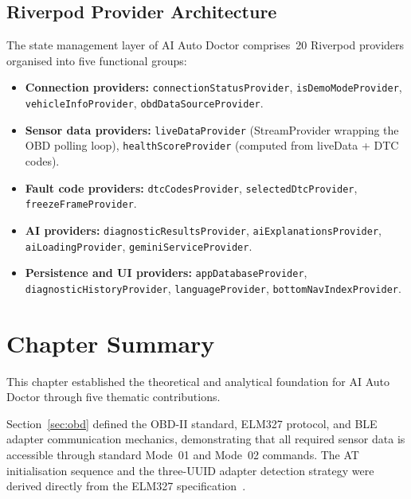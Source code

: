 \subsection{Riverpod Provider Architecture}

The state management layer of AI Auto Doctor comprises~20 Riverpod providers organised into five functional groups:

\begin{itemize}
  \item \textbf{Connection providers:} \texttt{connectionStatusProvider}, \texttt{isDemoModeProvider}, \texttt{vehicleInfoProvider}, \texttt{obdDataSourceProvider}.
  \item \textbf{Sensor data providers:} \texttt{liveDataProvider} (StreamProvider wrapping the OBD polling loop), \texttt{healthScoreProvider} (computed from liveData + DTC codes).
  \item \textbf{Fault code providers:} \texttt{dtcCodesProvider}, \texttt{selectedDtcProvider}, \texttt{freezeFrameProvider}.
  \item \textbf{AI providers:} \texttt{diagnosticResultsProvider}, \texttt{aiExplanationsProvider}, \texttt{aiLoadingProvider}, \texttt{geminiServiceProvider}.
  \item \textbf{Persistence and UI providers:} \texttt{appDatabaseProvider}, \texttt{diagnosticHistoryProvider}, \texttt{languageProvider}, \texttt{bottomNavIndexProvider}.
\end{itemize}


\section{Chapter Summary}
\label{sec:ch1summary}

This chapter established the theoretical and analytical foundation for AI Auto Doctor through five thematic contributions.

Section~\ref{sec:obd} defined the OBD-II standard, ELM327 protocol, and BLE adapter communication mechanics, demonstrating that all required sensor data is accessible through standard Mode~01 and Mode~02 commands.
The AT initialisation sequence and the three-UUID adapter detection strategy were derived directly from the ELM327 specification~\cite{elm2019}.

